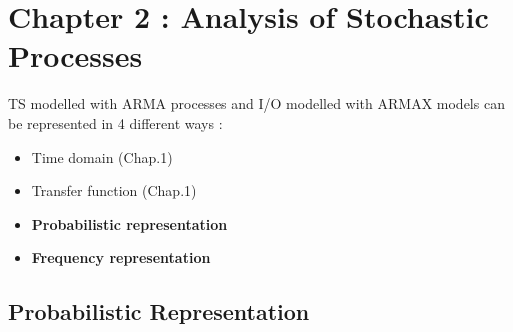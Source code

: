 \section{Chapter 2 : Analysis of Stochastic Processes}
TS modelled with ARMA processes and I/O modelled with ARMAX models can be represented in 4 different ways : 
\begin{itemize}
\item Time domain (Chap.1)
\item Transfer function (Chap.1)
\item \textbf{Probabilistic representation}
\item \textbf{Frequency representation}
\end{itemize}
\subsection{Probabilistic Representation}
